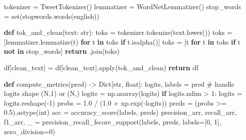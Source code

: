 \documentclass[
  letterpaper,
  DIV=11,
  numbers=noendperiod]{scrartcl}
\newenvironment{Shaded}{\begin{snugshade}}{\end{snugshade}}
\newcommand{\BuiltInTok}[1]{\textcolor[rgb]{0.00,0.23,0.31}{#1}}
\newcommand{\CommentTok}[1]{\textcolor[rgb]{0.37,0.37,0.37}{#1}}
\newcommand{\ControlFlowTok}[1]{\textcolor[rgb]{0.00,0.23,0.31}{\textbf{#1}}}
\newcommand{\DecValTok}[1]{\textcolor[rgb]{0.68,0.00,0.00}{#1}}
\newcommand{\FloatTok}[1]{\textcolor[rgb]{0.68,0.00,0.00}{#1}}
\newcommand{\KeywordTok}[1]{\textcolor[rgb]{0.00,0.23,0.31}{\textbf{#1}}}
\newcommand{\NormalTok}[1]{\textcolor[rgb]{0.00,0.23,0.31}{#1}}
\newcommand{\OperatorTok}[1]{\textcolor[rgb]{0.37,0.37,0.37}{#1}}
\newcommand{\StringTok}[1]{\textcolor[rgb]{0.13,0.47,0.30}{#1}}
\begin{document}
\begin{Shaded}
\begin{Highlighting}[]
\NormalTok{    tokenizer }\OperatorTok{=}\NormalTok{ TweetTokenizer()}
\NormalTok{    lemmatizer }\OperatorTok{=}\NormalTok{ WordNetLemmatizer()}
\NormalTok{    stop\_words }\OperatorTok{=} \BuiltInTok{set}\NormalTok{(stopwords.words(}\StringTok{\textquotesingle{}english\textquotesingle{}}\NormalTok{))}

    \KeywordTok{def}\NormalTok{ tok\_and\_clean(text: }\BuiltInTok{str}\NormalTok{):}
\NormalTok{        toks }\OperatorTok{=}\NormalTok{ tokenizer.tokenize(text.lower())}
\NormalTok{        toks }\OperatorTok{=}\NormalTok{ [lemmatizer.lemmatize(t) }\ControlFlowTok{for}\NormalTok{ t }\KeywordTok{in}\NormalTok{ toks }\ControlFlowTok{if}\NormalTok{ t.isalpha()]}
\NormalTok{        toks }\OperatorTok{=}\NormalTok{ [t }\ControlFlowTok{for}\NormalTok{ t }\KeywordTok{in}\NormalTok{ toks }\ControlFlowTok{if}\NormalTok{ t }\KeywordTok{not} \KeywordTok{in}\NormalTok{ stop\_words]}
        \ControlFlowTok{return} \StringTok{\textquotesingle{} \textquotesingle{}}\NormalTok{.join(toks)}

\NormalTok{    df[}\StringTok{\textquotesingle{}clean\_text\textquotesingle{}}\NormalTok{] }\OperatorTok{=}\NormalTok{ df[}\StringTok{\textquotesingle{}clean\_text\textquotesingle{}}\NormalTok{].}\BuiltInTok{apply}\NormalTok{(tok\_and\_clean)}
    \ControlFlowTok{return}\NormalTok{ df}

\KeywordTok{def}\NormalTok{ compute\_metrics(pred) }\OperatorTok{{-}\textgreater{}}\NormalTok{ Dict[}\BuiltInTok{str}\NormalTok{, }\BuiltInTok{float}\NormalTok{]:}
\NormalTok{    logits, labels }\OperatorTok{=}\NormalTok{ pred}
    \CommentTok{\# handle logits shape (N,1) or (N,)}
\NormalTok{    logits }\OperatorTok{=}\NormalTok{ np.asarray(logits)}
    \ControlFlowTok{if}\NormalTok{ logits.ndim }\OperatorTok{\textgreater{}} \DecValTok{1}\NormalTok{:}
\NormalTok{        logits }\OperatorTok{=}\NormalTok{ logits.reshape(}\OperatorTok{{-}}\DecValTok{1}\NormalTok{)}
\NormalTok{    probs }\OperatorTok{=} \FloatTok{1.0} \OperatorTok{/}\NormalTok{ (}\FloatTok{1.0} \OperatorTok{+}\NormalTok{ np.exp(}\OperatorTok{{-}}\NormalTok{logits))}
\NormalTok{    preds }\OperatorTok{=}\NormalTok{ (probs }\OperatorTok{\textgreater{}=} \FloatTok{0.5}\NormalTok{).astype(}\BuiltInTok{int}\NormalTok{)}
\NormalTok{    acc }\OperatorTok{=}\NormalTok{ accuracy\_score(labels, preds)}
\NormalTok{    precision\_arr, recall\_arr, f1\_arr, \_ }\OperatorTok{=}\NormalTok{ precision\_recall\_fscore\_support(labels, preds, labels}\OperatorTok{=}\NormalTok{[}\DecValTok{0}\NormalTok{, }\DecValTok{1}\NormalTok{], zero\_division}\OperatorTok{=}\DecValTok{0}\NormalTok{)}


\end{Highlighting}
\end{Shaded}
\end{document}
